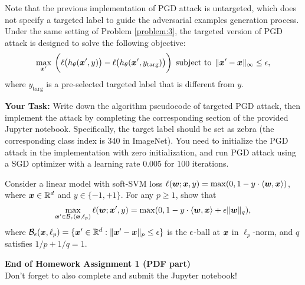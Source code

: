 \documentclass[11pt]{article}
\begin{document}
\directions{\clearpage}


\begin{problem}[10 pts]
\label{problem:4}
\rm
Note that the previous implementation of PGD attack is untargeted, which does not specify a targeted label to guide the adversarial examples generation process. Under the same setting of Problem \ref{problem:3}, the targeted version of PGD attack is designed to solve the following objective:
\begin{align*}
    \max_{\bm{x}'}\: \bigg(\ell\big(h_\theta(\bm{x}', y)\big) -\ell\big(h_\theta(\bm{x}', y_{\mathrm{targ}})\big)\bigg) \:\: \text{subject to} \:\: \|\bm{x}' - \bm{x}\|_\infty \leq \epsilon,
\end{align*}
where $y_{\mathrm{targ}}$ is a pre-selected targeted label that is different from $y$. 

\textbf{Your Task:} Write down the algorithm pseudocode of targeted PGD attack, then implement the attack by completing the corresponding section of the provided Jupyter notebook. Specifically, the target label should be set as zebra (the corresponding class index is 340 in ImageNet). You need to initialize the PGD attack in the implementation with zero initialization, and run PGD attack using a SGD optimizer with a learning rate $0.005$ for $100$ iterations.
\end{problem}



\directions{\clearpage}


\begin{problem}
\label{problem:bonus}
\rm
Consider a linear model with soft-SVM loss $\ell(\bm{w}; \bm{x}, y) = \max(0, 1 -y\cdot \langle \bm{w}, \bm{x} \rangle)$, where $\bm{x}\in\mathbb{R}^d$ and $y\in\{-1, +1\}$. For any $p\geq 1$, show that
\begin{align*}
    \max_{\bm{x}'\in\mathcal{B}_\epsilon(\bm{x}, \ell_p)} \ell(\bm{w}; \bm{x}', y) = \max(0, 1 -y\cdot \langle \bm{w}, \bm{x} \rangle + \epsilon \|\bm{w}\|_q),
\end{align*}
where $\mathcal{B}_\epsilon(\bm{x}, \ell_p) = \{\bm{x}'\in\mathbb{R}^d: \|\bm{x}' - \bm{x}\|_p \leq \epsilon\}$ is the $\epsilon$-ball at $\bm{x}$ in $\ell_p$-norm, and $q$ satisfies $1/p + 1/q = 1$.
\end{problem}




\vspace{20pt}


\begin{center}
{\bf End of Homework Assignment 1 (PDF part)} \\
Don't forget to also complete and submit the Jupyter notebook!
\end{center}
\end{document}
